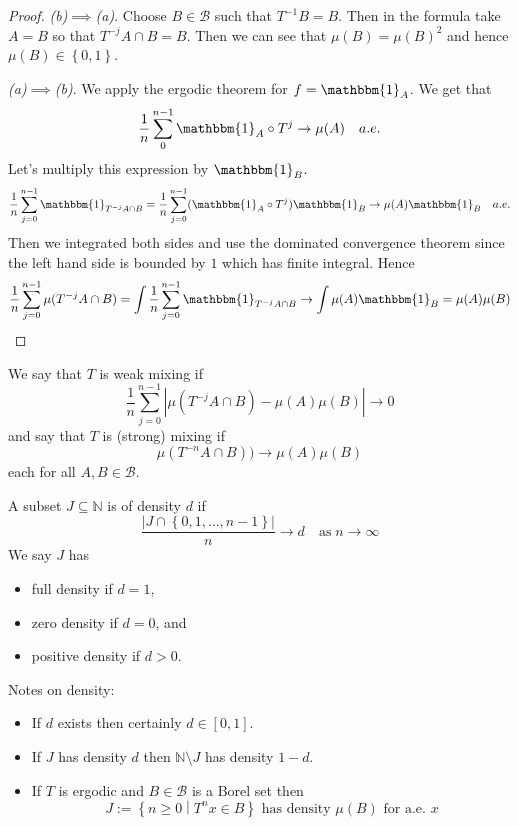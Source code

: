 \documentclass[11pt]{article}
\newcommand{\defeq}{:=}
\newcommand{\abs}[1]{\left|#1\right|}
\newcommand{\indic}[1]{\mathbbm{1}_{#1}}
\newcommand{\relmiddle}[1]{\mathrel{}\middle#1\mathrel{}}
\newcommand{\rmv}{\relmiddle|}
\newcommand{\N}{\mathbb{N}}
\newenvironment{defin}
	{\begin{mdframed}[backgroundcolor=white, roundcorner=5pt, linewidth=1pt]}
	{\end{mdframed}}
\newcommand{\mdf}[1]{{\color{red} #1}}
\begin{document}
\begin{proof}
\textit{(b)}$\implies$\textit{(a)}.
Choose $B\in\mathcal{B}$ such that $T^{-1}B=B$.
Then in the formula take $A=B$ so that $T^{-j}A\cap B=B$.
Then we can see that $\mu(B)=\mu(B)^2$ and hence $\mu(B)\in\left\{ 0, 1\right\}$.

\textit{(a)}$\implies$\textit{(b)}.
We apply the ergodic theorem for $f=\indic{A}$.
We get that
\[
	\frac{1}{n}\sum_{0}^{n-1}\indic{A}\circ T^j \to \mu(A) \quad a.e.
\]
Let's multiply this expression by $\indic{B}$.
\[
	\frac{1}{n}\sum_{j=0}^{n-1}\indic{T^{-j}A\cap B} = \frac{1}{n}\sum_{j=0}^{n-1}(\indic{A}\circ T^j)\indic{B} \to \mu(A)\indic{B}\quad a.e.
\]
Then we integrated both sides and use the dominated convergence theorem since the left hand side is bounded by $1$ which has finite integral.
Hence
\[
	\frac{1}{n}\sum_{j=0}^{n-1}\mu(T^{-j}A\cap B) = \int \frac{1}{n}\sum_{j=0}^{n-1}\indic{T^{-j}A\cap B} \to \int \mu(A) \indic{B} = \mu(A) \mu(B)
\]
\end{proof}

\begin{defin}
	We say that $T$ is \mdf{weak mixing} if
	\[
		\frac{1}{n}\sum_{j=0}^{n-1}\abs{\mu(T^{-j}A\cap B) - \mu(A)\mu(B)} \to 0
	\]
	and say that $T$ is \mdf{(strong) mixing} if
	\[
		\mu(T^{-n}A\cap B)) \to \mu(A)\mu(B)
	\]
	each for all $A, B\in\mathcal{B}$.

	A subset $J\subseteq \N$ is of \mdf{density $d$} if
	\[
		\frac{\abs{J\cap \left\{ 0, 1, \dots , n-1\right\}}}{n}\to d\quad \text{as} \; n\to\infty
	\]
	We say $J$ has
	\begin{itemize}
		\item \mdf{full density} if $d=1$,
		\item \mdf{zero density} if $d=0$, and
		\item \mdf{positive density} if $d>0$.
	\end{itemize}
\end{defin}

Notes on density:
\begin{itemize}
	\item If $d$ exists then certainly $d\in \left[ 0, 1\right]$.
	\item If $J$ has density $d$ then $\N \setminus J$ has density $1-d$.
	\item If $T$ is ergodic and $B\in\mathcal{B}$ is a Borel set then
		\[
			J\defeq\left\{ n \geq 0 \rmv T^n x \in B\right\}\text{ has density }\mu(B) \text{ for a.e. }x
		\]
\end{itemize}
\end{document}
